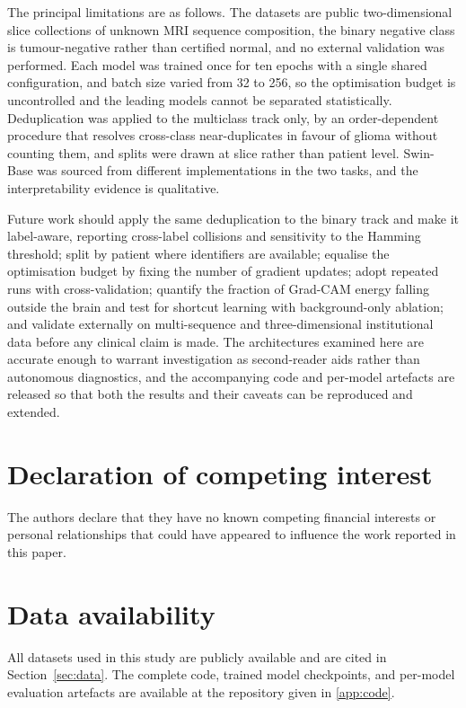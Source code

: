 \documentclass[final,3p,times,number]{elsarticle}
\begin{document}
The principal limitations are as follows. The datasets are public two-dimensional slice collections of unknown MRI sequence composition, the binary negative class is tumour-negative rather than certified normal, and no external validation was performed. Each model was trained once for ten epochs with a single shared configuration, and batch size varied from 32 to 256, so the optimisation budget is uncontrolled and the leading models cannot be separated statistically. Deduplication was applied to the multiclass track only, by an order-dependent procedure that resolves cross-class near-duplicates in favour of glioma without counting them, and splits were drawn at slice rather than patient level. Swin-Base was sourced from different implementations in the two tasks, and the interpretability evidence is qualitative.

Future work should apply the same deduplication to the binary track and make it label-aware, reporting cross-label collisions and sensitivity to the Hamming threshold; split by patient where identifiers are available; equalise the optimisation budget by fixing the number of gradient updates; adopt repeated runs with cross-validation; quantify the fraction of Grad-CAM energy falling outside the brain and test for shortcut learning with background-only ablation; and validate externally on multi-sequence and three-dimensional institutional data before any clinical claim is made. The architectures examined here are accurate enough to warrant investigation as second-reader aids rather than autonomous diagnostics, and the accompanying code and per-model artefacts are released so that both the results and their caveats can be reproduced and extended.

\section*{Declaration of competing interest}

The authors declare that they have no known competing financial interests or personal relationships that could have appeared to influence the work reported in this paper.

\section*{Data availability}

All datasets used in this study are publicly available and are cited in Section~\ref{sec:data}. The complete code, trained model checkpoints, and per-model evaluation artefacts are available at the repository given in \ref{app:code}.
\end{document}
